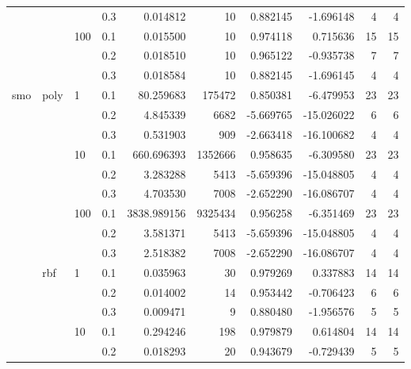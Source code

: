 \begin{table}[h!]
\begin{tabular}{llllrrrrrr}
       &     &     & 0.3 &     0.014812 &       10 &  0.882145 &  -1.696148 &           4 &         4 \\
       &     & 100 & 0.1 &     0.015500 &       10 &  0.974118 &   0.715636 &          15 &        15 \\
       &     &     & 0.2 &     0.018510 &       10 &  0.965122 &  -0.935738 &           7 &         7 \\
       &     &     & 0.3 &     0.018584 &       10 &  0.882145 &  -1.696145 &           4 &         4 \\
smo & poly & 1   & 0.1 &    80.259683 &   175472 &  0.850381 &  -6.479953 &          23 &        23 \\
       &     &     & 0.2 &     4.845339 &     6682 & -5.669765 & -15.026022 &           6 &         6 \\
       &     &     & 0.3 &     0.531903 &      909 & -2.663418 & -16.100682 &           4 &         4 \\
       &     & 10  & 0.1 &   660.696393 &  1352666 &  0.958635 &  -6.309580 &          23 &        23 \\
       &     &     & 0.2 &     3.283288 &     5413 & -5.659396 & -15.048805 &           4 &         4 \\
       &     &     & 0.3 &     4.703530 &     7008 & -2.652290 & -16.086707 &           4 &         4 \\
       &     & 100 & 0.1 &  3838.989156 &  9325434 &  0.956258 &  -6.351469 &          23 &        23 \\
       &     &     & 0.2 &     3.581371 &     5413 & -5.659396 & -15.048805 &           4 &         4 \\
       &     &     & 0.3 &     2.518382 &     7008 & -2.652290 & -16.086707 &           4 &         4 \\
       & rbf & 1   & 0.1 &     0.035963 &       30 &  0.979269 &   0.337883 &          14 &        14 \\
       &     &     & 0.2 &     0.014002 &       14 &  0.953442 &  -0.706423 &           6 &         6 \\
       &     &     & 0.3 &     0.009471 &        9 &  0.880480 &  -1.956576 &           5 &         5 \\
       &     & 10  & 0.1 &     0.294246 &      198 &  0.979879 &   0.614804 &          14 &        14 \\
       &     &     & 0.2 &     0.018293 &       20 &  0.943679 &  -0.729439 &           5 &         5 \\

\end{tabular}
\end{table}
